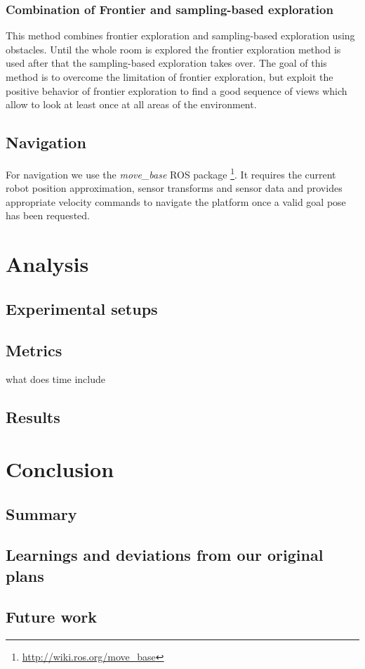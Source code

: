 \documentclass[a4paper,11pt,english]{article}
\begin{document}
\subsubsection{Combination of Frontier and sampling-based exploration}
This method combines frontier exploration and sampling-based exploration using obstacles.
Until the whole room is explored the frontier exploration method is used after that the sampling-based exploration takes over. 
The goal of this method is to overcome the limitation of frontier exploration, but exploit the positive behavior of frontier exploration to find a good sequence of views which allow to look at least once at all areas of the environment.

\subsection{Navigation}
For navigation we use the \textit{move\_base} ROS package \footnote{\url{http://wiki.ros.org/move_base}}.
It requires the current robot position approximation, sensor transforms and sensor data and provides appropriate velocity commands to navigate the platform once a valid goal pose has been requested.

\section{Analysis}
\label{Analysis}

\subsection{Experimental setups}
\subsection{Metrics}
what does time include
\subsection{Results}

\section{Conclusion}
\label{Conclusion}

\subsection{Summary}
\subsection{Learnings and deviations from our original plans}
\subsection{Future work}

\newpage


\end{document}
